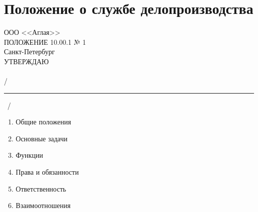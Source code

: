 \documentclass[a4paper,12pt]{article}
\begin{document}
\chapter{Положение о службе делопроизводства}

\begin{multicols}{2}
	ООО <<Аглая>>\\
	\vfill
	ПОЛОЖЕНИЕ 10.00.1 № 1\\ 
	Санкт-Петербург\\
	\vfill\null
	\columnbreak
	УТВЕРЖДАЮ \\
	\\
		/\rule{10em}{1pt}\ / \\
\end{multicols}

\vfill
{}

\begin{enumerate}
	\item Общие положения
	\item Основные задачи
	\item Функции
	\item Права и обязанности
	\item Ответственность
	\item Взаимоотношения
\end{enumerate}

\vfill

	
	
\newpage
\pagestyle{plain}
\titleformat{\section}[block]{\Large\bfseries\filcenter}{\thesection}{1em}{}
\renewcommand*{\theenumi}{\thesection.\arabic{enumi}}
\renewcommand*{\theenumii}{\theenumi.\arabic{enumii}}
\end{document}
